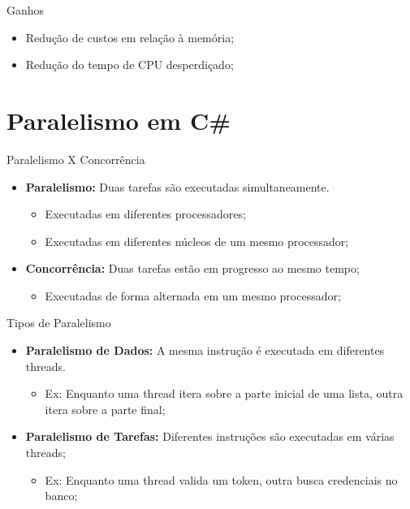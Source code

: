 \documentclass[10pt]{beamer}
\begin{document}
\begin{frame}{Ganhos}
	\begin{itemize}
		\item Redução de custos em relação à memória;
		\item Redução do tempo de CPU desperdiçado;
	\end{itemize}
\end{frame}

\section{Paralelismo em C\#}

\begin{frame}{Paralelismo X Concorrência}
	\begin{itemize}
		\item \textbf{Paralelismo:} Duas tarefas são executadas simultaneamente.
		\begin{itemize}
			\item Executadas em diferentes processadores;
			\item Executadas em diferentes núcleos de um mesmo processador;
		\end{itemize}
		\vspace{0.2cm}
		\item \textbf{Concorrência:} Duas tarefas estão em progresso ao mesmo tempo;
		\begin{itemize}
			\item Executadas de forma alternada em um mesmo processador;
		\end{itemize}
	\end{itemize}
\end{frame}

\begin{frame}{Tipos de Paralelismo}
	\begin{itemize}
		\item \textbf{Paralelismo de Dados:} A mesma instrução é executada em diferentes threads.
		\begin{itemize}
			\item Ex: Enquanto uma thread itera sobre a parte inicial de uma lista, outra itera sobre a parte final; 
		\end{itemize}
		\vspace{0.2cm}
		\item \textbf{Paralelismo de Tarefas:} Diferentes instruções são executadas em várias threads;
		\begin{itemize}
			\item Ex: Enquanto uma thread valida um token, outra busca credenciais no banco;
		\end{itemize}
	\end{itemize}
\end{frame}
\end{document}
